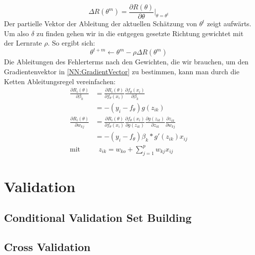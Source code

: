 \documentclass[a4paper,12pt]{thesis}
\begin{document}
\begin{equation}
	\label{NN:GradientVector}
	\Delta R(\theta^m)=\frac{\partial R(\theta)}{\partial \theta}|_{\theta=\theta^t}
\end{equation}
Der partielle Vektor der Ableitung der aktuellen Schätzung von $\theta^t$ zeigt aufwärts. Um also $\delta$ zu finden gehen wir in die entgegen gesetzte Richtung gewichtet mit der Lernrate $\rho$. So ergibt sich:
\begin{equation}
	\label{NN:Lernfunktion}
	\theta^{t+m} \leftarrow \theta^m -\rho \Delta R(\theta^m)
\end{equation}
Die Ableitungen des Fehlerterms nach den Gewichten, die wir brauchen, um den Gradientenvektor in \ref{NN:GradientVector} zu bestimmen, kann man durch die Ketten Ableitungsregel vereinfachen:
\begin{equation}
	\label{NN:ChainRule}
	\begin{aligned}
		\frac{\partial R_i(\theta)}{\partial \beta_k}& = \frac{\partial R_i(\theta)}{\partial f_{\theta} (x_i)} \frac{\partial f_{\theta} (x_i)}{\partial \beta_k}\\
		& = -(y_i - f_{\theta})g(z_{ik})\\
		\frac{\partial R_i(\theta)}{\partial w_{kj}}& = \frac{\partial R_i(\theta)}{\partial f_{\theta} (x_i)} \frac{\partial f_{\theta} (x_i)}{\partial g(z_{ik})} \frac{\partial g(z_{ik}) }{\partial z_{ik}} \frac{\partial z_{ik}}{\partial w_{kj}}\\
		& = -(y_i - f_{\theta})\beta_k*g'(z_{ik})x_{ij}\\
		\text{mit}& \; \; z_{ik}=w_{ko}+ \sum^p_{j=1}w_{kj}x_{ij}
	\end{aligned} 
\end{equation}

\section{Validation}

\subsection{Conditional Validation Set Building}

\subsection{Cross Validation}
\end{document}
